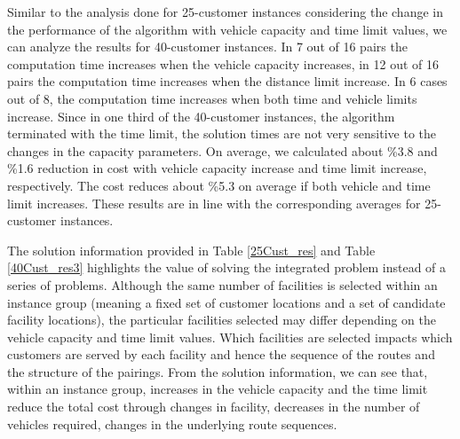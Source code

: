 Similar to the analysis done for 25-customer instances considering the change in the
performance of the algorithm  with vehicle capacity and time limit values,
we can analyze the results for 40-customer instances. In  7 out of 16 pairs the
computation time increases when the vehicle capacity increases, in 12 out of 16 pairs
the computation time increases when the distance limit increase. In 6 cases out of 8,
the computation time increases when both time and vehicle limits increase.
Since in one third of the 40-customer instances, the algorithm terminated with the time
limit, the solution times are not very sensitive to the changes in the capacity parameters.
On average, we calculated about \%3.8 and \%1.6 reduction in cost
with vehicle capacity increase and time limit increase, respectively. The cost
reduces about \%5.3 on average if both vehicle and time limit increases. These results
are in line with the corresponding averages for 25-customer instances.

The solution information provided in Table
\ref{25Cust_res} and Table \ref{40Cust_res3} highlights the value of solving the integrated
problem instead of a series of problems.  Although the same number of facilities is selected
within an instance group (meaning a fixed set of customer locations and a set of candidate
facility locations), the particular facilities selected may differ depending on the vehicle
capacity and time limit values.  Which facilities are selected impacts which customers
are served by each facility and hence the sequence of the routes and the structure of the
pairings. From the solution information, we can see that, within an instance group,
increases in the vehicle capacity and the time limit reduce the total cost through changes
in facility, decreases in the number of vehicles required, changes in the underlying route
sequences.


